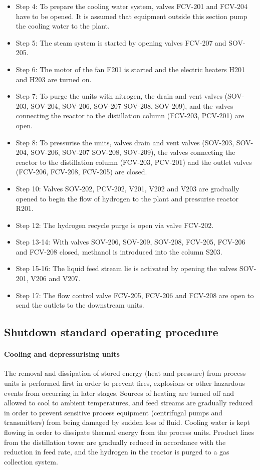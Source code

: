 
\begin{itemize}
    \item Step 4: To prepare the cooling water system, valves FCV-201 and FCV-204 have to be opened. It is assumed that equipment outside this section pump the cooling water to the plant.
    \item Step 5: The steam system is started by opening valves FCV-207 and SOV-205.
    \item Step 6: The motor of the fan F201 is started and the electric heaters H201 and H203 are turned on. 
    \item Step 7: To purge the units with nitrogen, the drain and vent valves (SOV-203, SOV-204, SOV-206, SOV-207 SOV-208, SOV-209), and the valves connecting the reactor to the distillation column  (FCV-203, PCV-201) are open. 
    \item Step 8: To pressurise the units, valves drain and vent valves (SOV-203, SOV-204, SOV-206, SOV-207 SOV-208, SOV-209), the valves connecting the reactor to the distillation column (FCV-203, PCV-201) and the outlet valves (FCV-206, FCV-208, FCV-205) are closed. 
    \item Step 10: Valves SOV-202, PCV-202, V201, V202 and V203 are gradually opened to begin the flow of hydrogen to the plant and pressurise reactor R201.
    \item Step 12: The hydrogen recycle purge is open via valve FCV-202.
    \item Step 13-14: With valves SOV-206, SOV-209, SOV-208, FCV-205, FCV-206 and FCV-208 closed, methanol is introduced into the column S203.
    \item Step 15-16: The liquid feed stream lie is activated by opening the valves SOV-201, V206 and V207.
    \item Step 17: The flow control valve FCV-205, FCV-206 and FCV-208 are open to send the outlets to the downstream units.
\end{itemize}


\subsection{Shutdown standard operating procedure}

\paragraph{Cooling and depressurising units}
The removal and dissipation of stored energy (heat and pressure) from process units is performed first in order to prevent fires, explosions or other hazardous events from occurring in later stages. Sources of heating are turned off and allowed to cool to ambient temperatures, and feed streams are gradually reduced in order to prevent sensitive process equipment (centrifugal pumps and transmitters) from being damaged by sudden loss of fluid. Cooling water is kept flowing in order to dissipate thermal energy from the process units. Product lines from the distillation tower are gradually reduced in accordance with the reduction in feed rate, and the hydrogen in the reactor is purged to a gas collection system.

